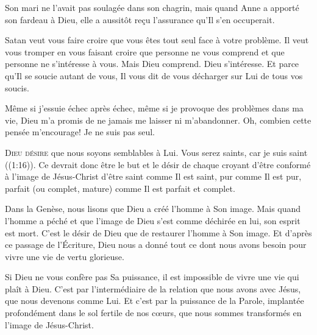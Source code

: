 
Son mari ne l'avait pas soulagée dans son chagrin,
 mais quand Anne a apporté son fardeau à Dieu,
 elle a aussitôt reçu l'assurance qu'Il s'en occuperait.

Satan veut vous faire croire que vous êtes tout seul face à votre problème.
 Il veut vous tromper en vous faisant croire que personne ne vous comprend
 et que personne ne s'intéresse à vous. Mais Dieu comprend. Dieu s'intéresse.
 Et parce qu'Il se soucie autant de vous, Il vous dit de vous décharger
 sur Lui de tous vos soucis.

Même si j'essuie échec après échec, même si je provoque des problèmes
 dans ma vie, Dieu m'a promis de ne jamais me laisser ni m'abandonner.
 Oh, combien cette pensée m'encourage! Je ne suis pas seul.

\dvrule






\lettrine{D}{ieu désire} que nous soyons semblables à Lui.
 \og Vous serez saints, car je suis saint \fg{} ((1:16)).
 Ce devrait donc être le but et le désir de chaque croyant d'être conformé
 à l'image de Jésus-Christ \ocadr d'être saint comme Il est saint,
 pur comme Il est pur, parfait (ou complet, mature)
 comme Il est parfait et complet.

Dans la Genèse, nous lisons que Dieu a créé l'homme à Son image.
 Mais quand l'homme a péché et que l'image de Dieu s'est comme déchirée en lui,
 son esprit est mort. C'est le désir de Dieu que de restaurer l'homme
 à Son image. Et d'après ce passage de l'Écriture,
 Dieu nous a donné tout ce dont nous avons besoin
 pour vivre une vie de vertu glorieuse.


Si Dieu ne vous confère pas Sa puissance, il est impossible de vivre une vie
 qui plaît à Dieu. C'est par l'intermédiaire de la relation que nous avons
 avec Jésus, que 
 nous devenons comme Lui. Et c'est par la puissance de la Parole,
 implantée profondément dans le sol fertile de nos c\oe{}urs,
 que nous sommes transformés en l'image de Jésus-Christ.

